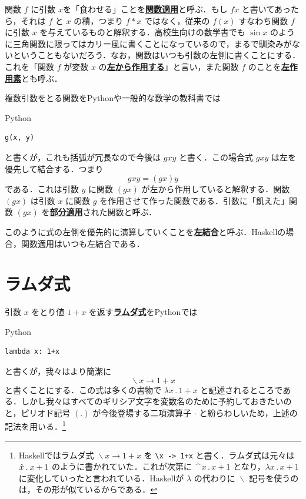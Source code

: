 \documentclass[a4paper,twocolumn]{jsbook}
\newcommand{\programminglanguage}[1]{\textsf{#1}}
\newcommand{\haskell}{\programminglanguage{Haskell}}
\newcommand{\python}{\programminglanguage{Python}}
\newcommand{\keyword}[1]{{\underline{\textbf{#1}}}}
\newcommand{\code}[1]{\texttt{#1}}
\newenvironment{pythoncode}{\begin{itembox}[r]{\python}}{\end{itembox}}
\DeclareMathOperator{\mLambda}{\backslash}
\DeclareMathOperator{\mLambdaArrow}{\rightarrow}
\newcommand{\mLambdaExp}[2]{\mLambda{#1}\mLambdaArrow{#2}}
\begin{document}

関数 $f$ に引数 $x$を「食わせる」ことを\keyword{関数適用}と呼ぶ．もし $fx$ と書いてあったら，それは $f$ と $x$ の積，つまり $f*x$ ではなく，従来の $f(x)$ すなわち関数 $f$ に引数 $x$ を与えているものと解釈する．高校生向けの数学書でも $\sin x$ のように三角関数に限ってはカリー風に書くことになっているので，まるで馴染みがないということもないだろう．なお，関数はいつも引数の左側に書くことにする．これを「関数 $f$ が変数 $x$ の\keyword{左から作用する}」と言い，また関数 $f$ のことを\keyword{左作用素}とも呼ぶ．

複数引数をとる関数を\python や一般的な数学の教科書では
\begin{pythoncode}
\begin{verbatim}
g(x, y)
\end{verbatim}
\end{pythoncode}
と書くが，これも括弧が冗長なので今後は $gxy$ と書く．この場合式 $gxy$ は左を優先して結合する．つまり
\begin{equation}
gxy=(gx)y
\end{equation}
である．これは引数 $y$ に関数 $(gx)$ が左から作用していると解釈する．関数 $(gx)$ は引数 $x$ に関数 $g$ を作用させて作った関数である．引数に「飢えた」関数 $(gx)$ を\keyword{部分適用}された関数と呼ぶ．

このように式の左側を優先的に演算していくことを\keyword{左結合}と呼ぶ．\haskell の場合，関数適用はいつも左結合である．

\section{ラムダ式}

引数 $x$ をとり値 $1+x$ を返す\keyword{ラムダ式}を\python では
\begin{pythoncode}
\begin{verbatim}
lambda x: 1+x
\end{verbatim}
\end{pythoncode}
と書くが，我々はより簡潔に
\begin{equation}
\mLambdaExp{x}{1+x}
\end{equation}
と書くことにする．この式は多くの書物で $\lambda x\mathbin{.}1+x$ と記述されるところである．しかし我々はすべてのギリシア文字を変数名のために予約しておきたいのと，ピリオド記号 $(.)$ が今後登場する二項演算子 $\cdot$ と紛らわしいため，上述の記法を用いる．\footnote{\haskell ではラムダ式 $\mLambdaExp{x}{1+x}$ を \code{\textbackslash x -> 1+x} と書く．ラムダ式は元々は $\Hat x\mathbin{.}x+1$ のように書かれていた．これが次第に $\mathop{\texttt{\textasciicircum}}x\mathbin{.}x+1$ となり，$\lambda x\mathbin{.}x+1$ に変化していったと言われている．\haskell が $\lambda$ の代わりに $\mLambda$ 記号を使うのは，その形が似ているからである．}
\end{document}
